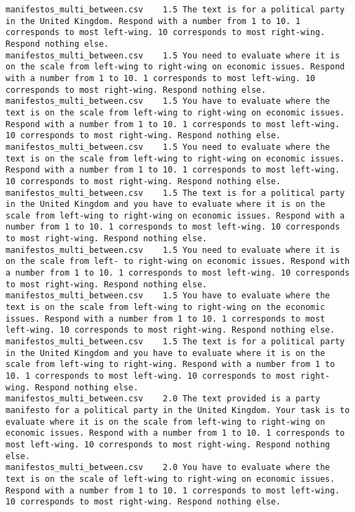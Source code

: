\begin{lstlisting}
manifestos_multi_between.csv	1.5	The text is for a political party in the United Kingdom. Respond with a number from 1 to 10. 1 corresponds to most left-wing. 10 corresponds to most right-wing. Respond nothing else.
manifestos_multi_between.csv	1.5	You need to evaluate where it is on the scale from left-wing to right-wing on economic issues. Respond with a number from 1 to 10. 1 corresponds to most left-wing. 10 corresponds to most right-wing. Respond nothing else.
manifestos_multi_between.csv	1.5	You have to evaluate where the text is on the scale from left-wing to right-wing on economic issues. Respond with a number from 1 to 10. 1 corresponds to most left-wing. 10 corresponds to most right-wing. Respond nothing else.
manifestos_multi_between.csv	1.5	You need to evaluate where the text is on the scale from left-wing to right-wing on economic issues. Respond with a number from 1 to 10. 1 corresponds to most left-wing. 10 corresponds to most right-wing. Respond nothing else.
manifestos_multi_between.csv	1.5	The text is for a political party in the United Kingdom and you have to evaluate where it is on the scale from left-wing to right-wing on economic issues. Respond with a number from 1 to 10. 1 corresponds to most left-wing. 10 corresponds to most right-wing. Respond nothing else.
manifestos_multi_between.csv	1.5	You need to evaluate where it is on the scale from left- to right-wing on economic issues. Respond with a number from 1 to 10. 1 corresponds to most left-wing. 10 corresponds to most right-wing. Respond nothing else.
manifestos_multi_between.csv	1.5	You have to evaluate where the text is on the scale from left-wing to right-wing on the economic issues. Respond with a number from 1 to 10. 1 corresponds to most left-wing. 10 corresponds to most right-wing. Respond nothing else.
manifestos_multi_between.csv	1.5	The text is for a political party in the United Kingdom and you have to evaluate where it is on the scale from left-wing to right-wing. Respond with a number from 1 to 10. 1 corresponds to most left-wing. 10 corresponds to most right-wing. Respond nothing else.
manifestos_multi_between.csv	2.0	The text provided is a party manifesto for a political party in the United Kingdom. Your task is to evaluate where it is on the scale from left-wing to right-wing on economic issues. Respond with a number from 1 to 10. 1 corresponds to most left-wing. 10 corresponds to most right-wing. Respond nothing else.
manifestos_multi_between.csv	2.0	You have to evaluate where the text is on the scale of left-wing to right-wing on economic issues. Respond with a number from 1 to 10. 1 corresponds to most left-wing. 10 corresponds to most right-wing. Respond nothing else.

\end{lstlisting}
